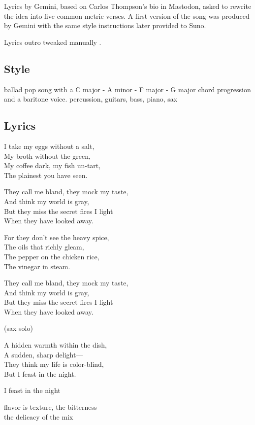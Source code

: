 Lyrics by Gemini, based on Carlos Thompson's bio in Mastodon, asked to
rewrite the idea into five common metric verses. A first version of the
song was produced by Gemini with the same style instructions later
provided to Suno.

Lyrics outro tweaked manually .

\subsection{Style}\label{style-1}

ballad pop song with a C major - A minor - F major - G major chord
progression and a baritone voice. percussion, guitars, bass, piano, sax

\subsection{Lyrics}\label{lyrics-1}

I take my eggs without a salt,\\
My broth without the green,\\
My coffee dark, my fish un-tart,\\
The plainest you have seen.

They call me bland, they mock my taste,\\
And think my world is gray,\\
But they miss the secret fires I light\\
When they have looked away.

For they don't see the heavy spice,\\
The oils that richly gleam,\\
The pepper on the chicken rice,\\
The vinegar in steam.

They call me bland, they mock my taste,\\
And think my world is gray,\\
But they miss the secret fires I light\\
When they have looked away.

(sax solo)

A hidden warmth within the dish,\\
A sudden, sharp delight---\\
They think my life is color-blind,\\
But I feast in the night.

I feast in the night

flavor is texture, the bitterness\\
the delicacy of the mix

